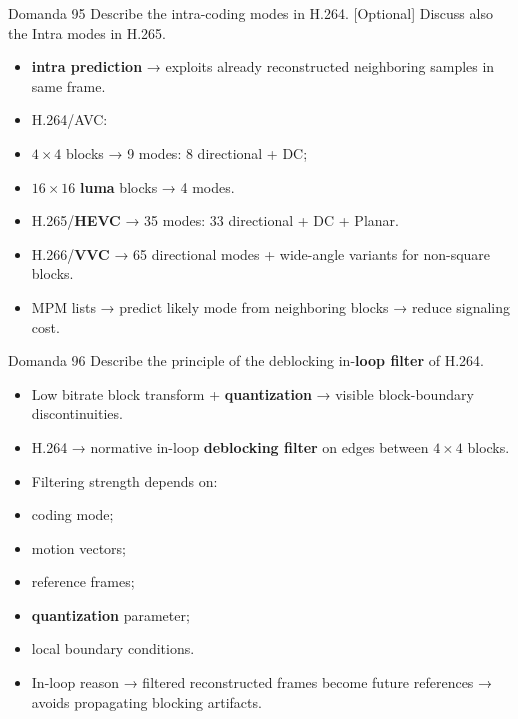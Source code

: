 \begin{questionbox}{Domanda 95}
Describe the intra-coding modes in H.264. [Optional] Discuss also the Intra modes in H.265.
\end{questionbox}


\begin{itemize}
  \item \textbf{intra prediction} → exploits already reconstructed neighboring samples in same frame.
  \item H.264/AVC:
  \item $4\times4$ blocks → 9 modes: 8 directional + DC;
  \item $16\times16$ \textbf{luma} blocks → 4 modes.
  \item H.265/\textbf{HEVC} → 35 modes: 33 directional + DC + Planar.
  \item H.266/\textbf{VVC} → 65 directional modes + wide-angle variants for non-square blocks.
  \item MPM lists → predict likely mode from neighboring blocks → reduce signaling cost.
\end{itemize}



\begin{questionbox}{Domanda 96}
Describe the principle of the deblocking in-\textbf{loop filter} of H.264.
\end{questionbox}


\begin{itemize}
  \item Low bitrate block transform + \textbf{quantization} → visible block-boundary discontinuities.
  \item H.264 → normative in-loop \textbf{deblocking filter} on edges between $4\times4$ blocks.
  \item Filtering strength depends on:
  \item coding mode;
  \item motion vectors;
  \item reference frames;
  \item \textbf{quantization} parameter;
  \item local boundary conditions.
  \item In-loop reason → filtered reconstructed frames become future references → avoids propagating blocking artifacts.
\end{itemize}


